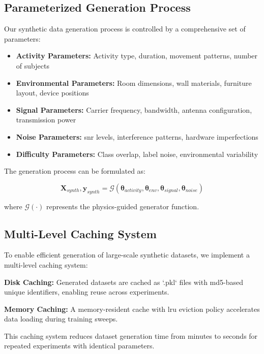 \documentclass[journal]{IEEEtran}
\begin{document}
\subsection{Parameterized Generation Process}

Our synthetic data generation process is controlled by a comprehensive set of parameters:

\begin{itemize}
\item \textbf{Activity Parameters:} Activity type, duration, movement patterns, number of subjects
\item \textbf{Environmental Parameters:} Room dimensions, wall materials, furniture layout, device positions
\item \textbf{Signal Parameters:} Carrier frequency, bandwidth, antenna configuration, transmission power
\item \textbf{Noise Parameters:} \gls{snr} levels, interference patterns, hardware imperfections
\item \textbf{Difficulty Parameters:} Class overlap, label noise, environmental variability
\end{itemize}

The generation process can be formulated as:

\begin{equation}
\mathbf{X}_{synth}, \mathbf{y}_{synth} = \mathcal{G}(\boldsymbol{\theta}_{activity}, \boldsymbol{\theta}_{env}, \boldsymbol{\theta}_{signal}, \boldsymbol{\theta}_{noise})
\end{equation}

where $\mathcal{G}(\cdot)$ represents the physics-guided generator function.

\subsection{Multi-Level Caching System}

To enable efficient generation of large-scale synthetic datasets, we implement a multi-level caching system:

\textbf{Disk Caching:} Generated datasets are cached as `.pkl` files with \gls{md5}-based unique identifiers, enabling reuse across experiments.

\textbf{Memory Caching:} A memory-resident cache with \gls{lru} eviction policy accelerates data loading during training sweeps.

This caching system reduces dataset generation time from minutes to seconds for repeated experiments with identical parameters.
\end{document}
